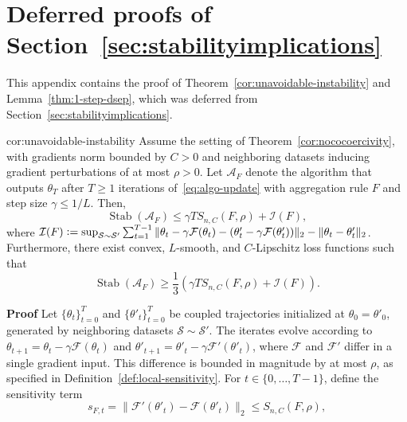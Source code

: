 \documentclass[twoside,11pt]{article}
\newcommand{\F}{\mathcal{F}}
\begin{document}
\section{Deferred proofs of Section~\ref{sec:stabilityimplications}}\label{app:deferred-section-3-2}
This appendix contains the proof of Theorem~\ref{cor:unavoidable-instability} and Lemma~\ref{thm:1-step-dsep}, which was deferred from Section~\ref{sec:stabilityimplications}.
\begin{reptheorem}{cor:unavoidable-instability}
    Assume the setting of Theorem~\ref{cor:nococoercivity}, with gradients norm bounded by $C>0$ and neighboring datasets inducing gradient perturbations of at most $\rho > 0$.
    Let $\mathcal{A}_F$ denote the algorithm that outputs $\theta_T$ after $T \geq 1$ iterations of~\eqref{eq:algo-update} with aggregation rule $F$ and step size $\gamma \leq 1/L$.
    Then,
    \begin{equation}\label{eq:USparameter-app}
        \textstyle \operatorname{Stab}(\mathcal{A}_{F}) \leq \gamma T S_{n, C}(F, \rho) + \mathcal{I}(F),
    \end{equation}
    where $\mathcal{I}(F) \vcentcolon= \sup_{\mathcal{S} \sim \mathcal{S}'}\sum_{t=1}^{T-1} \| \theta_t - \gamma \mathcal{F}(\theta_t) - (\theta_t' - \gamma \mathcal{F}(\theta_t')) \|_2 - \| \theta_t - \theta_t' \|_2$.
    Furthermore, there exist convex, $L$-smooth, and $C$-Lipschitz loss functions such that
    \begin{equation}\label{eq:unified-lower-bound-app}
        \textstyle \operatorname{Stab}(\mathcal{A}_{F}) \geq \frac{1}{3} \left( \gamma T S_{n, C}(F, \rho) + \mathcal{I}(F) \right).
    \end{equation}
\end{reptheorem}
\noindent\textbf{Proof}\;
    Let $\{\theta_t\}_{t=0}^T$ and $\{\theta'_t\}_{t=0}^T$ be coupled trajectories initialized at $\theta_0 = \theta'_0$, generated by neighboring datasets $\mathcal{S} \sim \mathcal{S}'$. 
    The iterates evolve according to $\theta_{t+1} = \theta_t - \gamma \F(\theta_t)$ and $\theta'_{t+1} = \theta'_t - \gamma \F'(\theta'_t)$, where $\F$ and $\F'$ differ in a single gradient input. 
    This difference is bounded in magnitude by at most $\rho$, as specified in Definition~\ref{def:local-sensitivity}.
    For $t\in \{0, \ldots, T-1\}$, define the sensitivity term 
    \begin{equation}\label{eq:sensitivity-assumption-eq}
        s_{F, t} = \| \F'(\theta'_t) - \F(\theta'_t) \|_2 \leq S_{n, C}(F, \rho),
    \end{equation}
\end{document}
